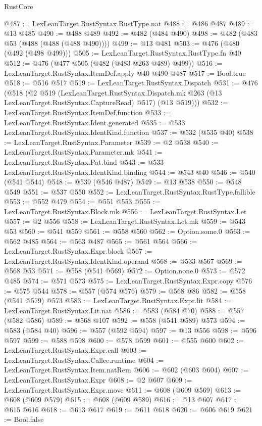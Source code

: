\begin{lexlean}{RustCore}
\begin{coremodule}
@487 := LexLeanTarget.RustSyntax.RustType.nat
@488 := @486 @487
@489 := @13 @485
@490 := @488 @489
@492 := @482 (@484 @490)
@498 := @482 (@483 @53 (@488 (@488 (@488 @490))))
@499 := @13 @481
@503 := @476 (@480 (@492 (@498 @499)))
@505 := LexLeanTarget.RustSyntax.RustType.fn @40
@512 := @476 (@477 @505 (@482 (@483 @263 @489) @499))
@516 := LexLeanTarget.RustSyntax.ItemDef.apply @40 @490 @487
@517 := Bool.true
@518 := @516 @517
@519 := LexLeanTarget.RustSyntax.Dispatch
@531 := @476
    (@518
      (@2
        @519
        (LexLeanTarget.RustSyntax.Dispatch.mk @263 (@13 LexLeanTarget.RustSyntax.CaptureRead) @517)
        (@13 @519)))
@532 := LexLeanTarget.RustSyntax.ItemDef.function
@533 := LexLeanTarget.RustSyntax.Ident.generated
@535 := @533 LexLeanTarget.RustSyntax.IdentKind.function
@537 := @532 (@535 @40)
@538 := LexLeanTarget.RustSyntax.Parameter
@539 := @2 @538
@540 := LexLeanTarget.RustSyntax.Parameter.mk
@541 := LexLeanTarget.RustSyntax.Pat.bind
@543 := @533 LexLeanTarget.RustSyntax.IdentKind.binding
@544 := @543 @40
@546 := @540 (@541 @544)
@548 := @539 (@546 @487)
@549 := @13 @538
@550 := @548 @549
@551 := @537 @550
@552 := LexLeanTarget.RustSyntax.RustType.fallible
@553 := @552 @479
@554 := @551 @553
@555 := LexLeanTarget.RustSyntax.Block.mk
@556 := LexLeanTarget.RustSyntax.Let
@557 := @2 @556
@558 := LexLeanTarget.RustSyntax.Let.mk
@559 := @543 @53
@560 := @541 @559
@561 := @558 @560
@562 := Option.some.{0}
@563 := @562 @485
@564 := @563 @487
@565 := @561 @564
@566 := LexLeanTarget.RustSyntax.Expr.block
@567 := LexLeanTarget.RustSyntax.IdentKind.operand
@568 := @533 @567
@569 := @568 @53
@571 := @558 (@541 @569)
@572 := Option.none.{0}
@573 := @572 @485
@574 := @571 @573
@575 := LexLeanTarget.RustSyntax.Expr.copy
@576 := @575 @544
@578 := @557 (@574 @576)
@579 := @568 @86
@582 := @558 (@541 @579) @573
@583 := LexLeanTarget.RustSyntax.Expr.lit
@584 := LexLeanTarget.RustSyntax.Lit.nat
@586 := @583 (@584 @70)
@588 := @557 (@582 @586)
@589 := @568 @107
@592 := @558 (@541 @589) @573
@594 := @583 (@584 @40)
@596 := @557 (@592 @594)
@597 := @13 @556
@598 := @596 @597
@599 := @588 @598
@600 := @578 @599
@601 := @555 @600
@602 := LexLeanTarget.RustSyntax.Expr.call
@603 := LexLeanTarget.RustSyntax.Callee.runtime
@604 := LexLeanTarget.RustSyntax.Item.natRem
@606 := @602 (@603 @604)
@607 := LexLeanTarget.RustSyntax.Expr
@608 := @2 @607
@609 := LexLeanTarget.RustSyntax.Expr.move
@611 := @608 (@609 @569)
@613 := @608 (@609 @579)
@615 := @608 (@609 @589)
@616 := @13 @607
@617 := @615 @616
@618 := @613 @617
@619 := @611 @618
@620 := @606 @619
@621 := Bool.false

\end{coremodule}
\end{lexlean}
